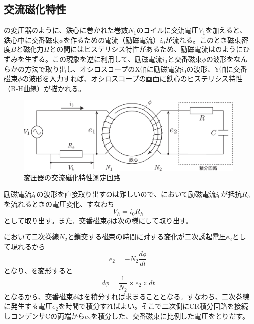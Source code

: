 \documentclass[11pt,dvipdfmx]{jarticle}
\begin{document}
\subsection{交流磁化特性}
の変圧器のように、鉄心に巻かれた巻数$N_1$のコイルに交流電圧$V_1$を加えると、鉄心中に交番磁束$\phi$を作るための電流（励磁電流）$i_0$が流れる。このとき磁束密度$B$と磁化力$H$との間にはヒステリシス特性があるため、励磁電流はのようにひずみを生ずる。この現象を逆に利用して、励磁電流$i_0$と交番磁束$\phi$の波形をなんらかの方法で取り出し、オシロスコープのX軸に励磁電流$i_0$の波形、Y軸に交番磁束$\phi$の波形を入力すれば、オシロスコープの画面に鉄心のヒステリシス特性（B-H曲線）が描かれる。
\begin{figure}[htbp]
	\centering
	\includegraphics[width=140mm]{fig/transformer.pdf}
	\caption{変圧器の交流磁化特性測定回路}
	\label{fig:hys:transformer}
\end{figure}

励磁電流$i_0$の波形を直接取り出すのは難しいので、において励磁電流$i_0$が抵抗$R_h$を流れるときの電圧変化、すなわち
\begin{equation}
	V_h = i_0R_h
\end{equation}
として取り出す。また、交番磁束$\phi$は次の様にして取り出す。

において二次巻線$N_2$と鎖交する磁束の時間に対する変化が二次誘起電圧$e_2$として現れるから
\begin{equation}
	e_2 = -N_2\frac{d \phi}{dt}
	\label{eq:hys:e2}
\end{equation}
となり、を変形すると
\begin{equation}
	d \phi = \frac{1}{N_2}\times e_2\times dt
	\label{eq:hys:dphi}
\end{equation}
となるから、交番磁束$\phi$はを積分すれば求まることとなる。すなわち、二次巻線に発生する電圧$e_2$を時間で積分すればよい。そこで二次側にCR積分回路を接続しコンデンサCの両端から$e_2$を積分した、交番磁束に比例した電圧をとりだす。
\end{document}
